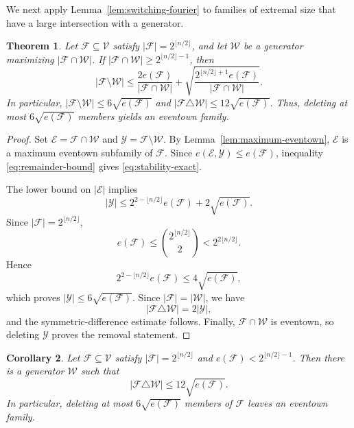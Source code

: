 \documentclass[11pt]{article}
\newtheorem{theorem}{Theorem}[section]
\newtheorem{corollary}[theorem]{Corollary}
\begin{document}
We next apply Lemma~\ref{lem:switching-fourier} to families of extremal size
that have a large intersection with a generator.

\begin{theorem}\label{thm:stability}
Let \(\mathcal F\subseteq\mathcal V\) satisfy
\(|\mathcal F|=2^{\lfloor n/2\rfloor}\), and let \(\mathcal W\) be a generator maximizing
\(|\mathcal F\cap\mathcal W|\).  If
\(
 |\mathcal F\cap\mathcal W|
 \ge
 2^{\lfloor n/2\rfloor-1}\), then
\begin{equation}
 |\mathcal F\setminus\mathcal W|
 \le
 \frac{2e(\mathcal F)}{|\mathcal F\cap\mathcal W|}
 +
 \sqrt{
       \frac{2^{\lfloor n/2\rfloor+1}e(\mathcal F)}
            {|\mathcal F\cap\mathcal W|}
      }.
\label{eq:stability-exact}
\end{equation}
In particular,
\(
 |\mathcal F\setminus\mathcal W|
 \le 6\sqrt{e(\mathcal F)}\) and 
 \(
 |\mathcal F\triangle\mathcal W|
 \le 12\sqrt{e(\mathcal F)}\).
Thus, deleting at most \(6\sqrt{e(\mathcal F)}\) members yields an
eventown family.
\end{theorem}

\begin{proof}
Set
\(\mathcal E=\mathcal F\cap\mathcal W\) and 
 \(\mathcal Y=\mathcal F\setminus\mathcal W\). 
By Lemma~\ref{lem:maximum-eventown}, \(\mathcal E\) is a maximum eventown
subfamily of \(\mathcal F\).  Since
\(e(\mathcal E,\mathcal Y)\le e(\mathcal F)\), inequality
\eqref{eq:remainder-bound} gives \eqref{eq:stability-exact}.

The lower bound on \(|\mathcal E|\) implies
\[
 |\mathcal Y|
 \le
 2^{2-\lfloor n/2\rfloor}e(\mathcal F)
 +2\sqrt{e(\mathcal F)}.
\]
Since \(|\mathcal F|=2^{\lfloor n/2\rfloor}\),
\[
 e(\mathcal F)
 \le
 \binom{2^{\lfloor n/2\rfloor}}{2}
 <
 2^{2\lfloor n/2\rfloor}.
\]
Hence
\[
 2^{2-\lfloor n/2\rfloor}e(\mathcal F)
 \le
 4\sqrt{e(\mathcal F)},
\]
which proves
\(|\mathcal Y|\le6\sqrt{e(\mathcal F)}\).  Since
\(|\mathcal F|=|\mathcal W|\), we have
\[
 |\mathcal F\triangle\mathcal W|=2|\mathcal Y|,
\]
and the symmetric-difference estimate follows.  Finally,
\(\mathcal F\cap\mathcal W\) is eventown, so deleting \(\mathcal Y\)
proves the removal statement.
\end{proof}

\begin{corollary}\label{cor:small-edge}
Let \(\mathcal F\subseteq\mathcal V\) satisfy
\(|\mathcal F|=2^{\lfloor n/2\rfloor}\) and \(e(\mathcal F)<2^{\lfloor n/2\rfloor-1}\). 
Then there is a generator \(\mathcal W\) such that
\[
 |\mathcal F\triangle\mathcal W|
 \le12\sqrt{e(\mathcal F)}.
\]
In particular, deleting at most \(6\sqrt{e(\mathcal F)}\) members of
\(\mathcal F\) leaves an eventown family.
\end{corollary}
\end{document}
